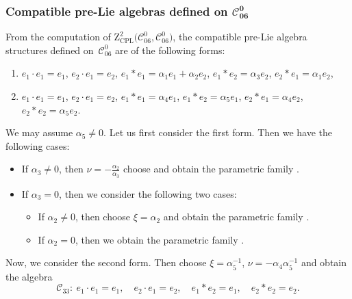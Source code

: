 \documentclass[10pt,a4paper]{amsart}
\numberwithin{equation}{section}
\begin{document}
\subsubsection[Compatible pre-Lie algebras defined on C\_\{06\}\^{}0]{Compatible pre-Lie algebras defined on $\boldsymbol{\mathcal{C}_{06}^{0}}$}

From the computation of $\mathrm{Z}_{\mathrm{CPL}}^{2}\bigl(\mathcal{C}_{06}^{0},%
\mathcal{C}_{06}^{0}\bigr)$, the compatible pre-Lie algebra structures defined on~$\mathcal{C}_{06}^{0}$ are of the following forms:
\begin{enumerate}\itemsep=0pt
\item[(1)] $e_{1}\cdot e_{1}=e_{1}$, $e_{2}\cdot e_{1}=e_{2}$,
$e_{1}\ast e_{1}=\alpha _{1}e_{1}+\alpha _{2}e_{2}$, $e_{1}\ast
e_{2}=\alpha _{3}e_{2}$, $e_{2}\ast e_{1}=\alpha _{1}e_{2}$,

\item[(2)] $e_{1}\cdot e_{1}=e_{1}$, $e_{2}\cdot e_{1}=e_{2}$,
$e_{1}\ast e_{1}=\alpha _{4}e_{1}$, $e_{1}\ast e_{2}=\alpha _{5}e_{1}$, $
e_{2}\ast e_{1}=\alpha _{4}e_{2}$, $e_{2}\ast e_{2}=\alpha _{5}e_{2}$.
\end{enumerate}

We may assume $\alpha _{5}\neq 0$.
Let us first consider the first form.
Then we have the following cases:
\begin{itemize}\itemsep=0pt
\item If $\alpha _{3}\neq 0$, then $\nu =-\frac{\alpha _{2}}{\alpha _{3}}$
choose and obtain the parametric family .

\item If $\alpha _{3}=0$, then we consider the following two cases:
\begin{itemize}\itemsep=0pt
\item If $\alpha _{2}\neq 0$, then choose $\xi =\alpha _{2}$ and obtain the
parametric family .
\item If $\alpha _{2}=0$, then we obtain the parametric family .
\end{itemize}
\end{itemize}

Now, we consider the second form. Then choose $\xi ={\alpha^{-1} _{5}}$, $\nu =-{\alpha _{4}}{\alpha^{-1} _{5}}$ and obtain the algebra
\[
{\mathcal{C}_{33}}\colon \
e_{1}\cdot e_{1}=e_{1}, \quad e_{2}\cdot e_{1}=e_{2}, \quad
e_{1}\ast e_{2}=e_{1}, \quad e_{2}\ast e_{2}=e_{2}.
\]
\end{document}
